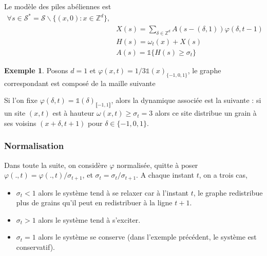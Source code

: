 \documentclass{article}
\theoremstyle{definition}
\newtheorem{exmp}{Exemple}[section]
\begin{document}
Le modèle des piles abéliennes est
\begin{align*}
	\forall s\in\mathcal{S}^* = \mathcal{S}\backslash\{(x,0) : x\in\mathbb{Z}^d\}, \\
	& X(s) = \sum_{\delta\in\mathbb{Z}^d} A(s-(\delta, 1))\varphi(\delta, t-1)\\
	& H(s) = \omega_t(x) + X(s)\\
	&A(s) = \mathds{1}\{H(s) \geq \sigma_t\}
\end{align*}
\begin{exmp}
Posons $d=1$ et $\varphi(x,t) = 1/3\mathds{1}(x)_{\{-1,0,1\}}$, le graphe correspondant est composé de la maille suivante \begin{center}  
\end{center}
Si l'on fixe $\varphi(\delta,t) = \mathds{1}(\delta)_{\llbracket -1, 1\rrbracket}$, alors la dynamique associée est la suivante : si un site $(x,t)$ est à hauteur $\omega(x,t)\geq \sigma_t = 3$ alors ce site distribue un grain à ses voisins $(x+\delta,t+1)$ pour $\delta\in \{-1,0,1\}$.
\end{exmp}
\subsubsection{Normalisation}
Dans toute la suite, on considère $\varphi$ normalisée, quitte à poser $\varphi(., t) = \varphi(., t)/\sigma_{t+1}$, et $\sigma_t = \sigma_t/\sigma_{t+1}$. A chaque instant $t$, on a trois cas, 
\begin{itemize}
	\item $\sigma_t < 1$ alors le système tend à se relaxer car à l'instant $t$, le graphe redistribue plus de grains qu'il peut en redistribuer à la ligne $t+1$.
	\item $\sigma_t > 1$ alors le système tend à s'exciter.
	\item $\sigma_t = 1$ alors le système se conserve (dans l'exemple précédent, le système est conservatif).
\end{itemize}
\end{document}
